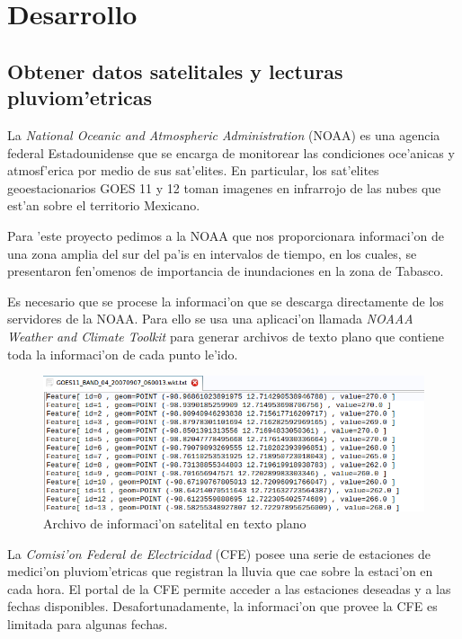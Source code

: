 \chapter{Desarrollo}

\section{Obtener datos satelitales y lecturas pluviom'etricas}

  La  \textit{National Oceanic and Atmospheric Administration} (NOAA) es una agencia federal Estadounidense que se encarga de 
  monitorear las condiciones oce'anicas y atmosf'erica por medio de sus sat'elites.
  En particular, los sat'elites geoestacionarios GOES 11 y 12 toman imagenes en infrarrojo de las nubes que est'an sobre
  el territorio Mexicano.

  Para 'este proyecto pedimos a la NOAA que nos proporcionara informaci'on de una zona amplia del sur del pa'is en 
  intervalos de tiempo, en los cuales, se presentaron fen'omenos de importancia de inundaciones en la zona de Tabasco.

  Es necesario que se procese la informaci'on que se descarga directamente de los servidores de la NOAA. Para ello se usa
  una aplicaci'on llamada \textit{NOAAA Weather and Climate Toolkit} para generar archivos de texto plano que contiene
  toda la informaci'on de cada punto le'ido.

  \begin{figure}[h!]
  \centering
  \includegraphics[width=170mm]{./imagenes/archivoTxt.png}
  \caption{Archivo de informaci'on satelital en texto plano}
  \end{figure}


  La \textit{Comisi'on Federal de Electricidad} (CFE) posee una serie de estaciones de medici'on pluviom'etricas que registran 
  la lluvia que cae sobre la estaci'on en cada hora. El portal de la CFE permite acceder a las estaciones deseadas 
  y a las fechas disponibles. Desafortunadamente, la informaci'on que provee la CFE es limitada para algunas fechas.




